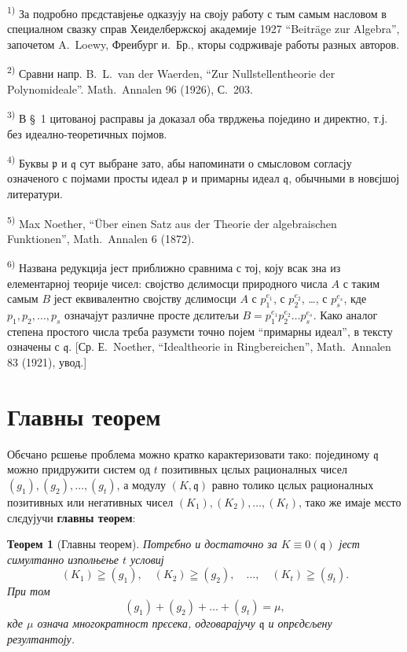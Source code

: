 \documentclass[11pt]{article}
\newcommand{\foreign}[1]{#1}
\theoremstyle{plain}
\newtheorem{satz}{Теорем}
\begin{document}
{\footnotesize
\textsuperscript{1)} За подробно прєдставјење одказују на своју работу с тым самым
насловом в специалном свазку справ Хеиделбержској академије 1927
``\foreign{Beiträge zur Algebra}'', започетом \foreign{A.\ Loewy}, Фреибург и.\ Бр., кторы
содрживаје работы разных авторов.

\textsuperscript{2)} Сравни напр. \foreign{B.\ L.\ van der Waerden}, ``\foreign{Zur Nullstellentheorie der Polynomideale}''.
\foreign{Math.\ Annalen} 96 (1926), С.~203.

\textsuperscript{3)} В \S~1 цитованој расправы ја доказал оба тврджења поједино и директно,
т.ј. без идеално-теоретичных појмов.

\textsuperscript{4)} Буквы $\mathfrak{p}$ и $\mathfrak{q}$ сут выбране зато, абы напоминати
о смысловом согласју означеного с појмами просты идеал
$\mathfrak{p}$ и примарны идеал $\mathfrak{q}$, обычными в новєјшој литератури.

\textsuperscript{5)} \foreign{Max Noether}, ``\foreign{Über einen Satz aus der Theorie der algebraischen Funktionen}'',
\foreign{Math.\ Annalen} 6 (1872).

\textsuperscript{6)} Названа редукција јест приближно сравнима с тој, коју всак зна из
елементарној теорије чисел: својство дєлимосци природного числа
$A$ с таким самым $B$ јест еквивалентно својству дєлимосци $A$ с
$p_{1}^{e_{1}}$, с $p_{2}^{e_{2}}$, \ldots, с $p_{s}^{e_{s}}$, кде
$p_{1}, p_{2}, \ldots, p_{s}$ означајут различне просте дєлитељи
$B = p_{1}^{e_{1}}p_{2}^{e_{2}} \ldots p_{s}^{e_{s}}$. Како аналог
степена простого числа трєба разумєти точно појем ``примарны идеал'',
в тексту означены с $\mathfrak{q}$. [Ср. Е.\ Noether,
``\foreign{Idealtheorie in Ringbereichen}'', \foreign{Math.\ Annalen} 83 (1921), увод.]
}

\newpage
\section*{Главны теорем}

Обєчано рєшење проблема можно кратко карактеризовати тако:
појединому $\mathfrak{q}$ можно придружити систем од $t$ позитивных
цєлых рационалных чисел $(g_{1}), (g_{2}), \ldots, (g_{t})$, а
модулу $(K, \mathfrak{q})$ равно толико цєлых рационалных позитивных
или негативных чисел $(K_{1}), (K_{2}), \ldots, (K_{t})$, тако же
имаје мєсто слєдујучи \textbf{главны теорем}:

\begin{satz}[Главны теорем]\label{satz:kap-II}
Потрєбно и достаточно за $K \equiv 0(\mathfrak{q})$ јест
симултанно изполњење $t$ условиј
\[
(K_1)\geqq(g_1),\quad (K_2)\geqq(g_2),\quad \ldots,\quad (K_t)\geqq(g_t).
\]
При том
\[
(g_1)+(g_2)+\ldots+(g_t)=\mu,
\]
кде $\mu$ означа многократност прєсека, одговарајучу
$\mathfrak{q}$ и опрєдєљену резултантоју.
\end{satz}
\end{document}
